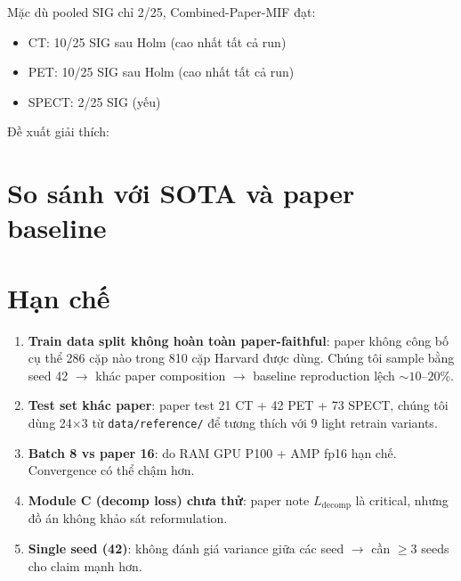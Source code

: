 Mặc dù pooled SIG chỉ 2/25, Combined-Paper-MIF đạt:
\begin{itemize}
    \item CT: 10/25 SIG sau Holm (cao nhất tất cả run)
    \item PET: 10/25 SIG sau Holm (cao nhất tất cả run)
    \item SPECT: 2/25 SIG (yếu)
\end{itemize}

Đề xuất giải thích:

\section{So sánh với SOTA và paper baseline}
\label{sec:disc-sota}


\section{Hạn chế}
\label{sec:limitations}

\begin{enumerate}
    \item \textbf{Train data split không hoàn toàn paper-faithful}: paper không công bố cụ thể 286 cặp nào trong 810 cặp Harvard được dùng. Chúng tôi sample bằng seed 42 $\to$ khác paper composition $\to$ baseline reproduction lệch $\sim 10\text{--}20\%$.
    \item \textbf{Test set khác paper}: paper test 21 CT + 42 PET + 73 SPECT, chúng tôi dùng 24$\times$3 từ \texttt{data/reference/} để tương thích với 9 light retrain variants.
    \item \textbf{Batch 8 vs paper 16}: do RAM GPU P100 + AMP fp16 hạn chế. Convergence có thể chậm hơn.
    \item \textbf{Module C (decomp loss) chưa thử}: paper note $L_{\mathrm{decomp}}$ là critical, nhưng đồ án không khảo sát reformulation.
    \item \textbf{Single seed (42)}: không đánh giá variance giữa các seed $\to$ cần $\geq 3$ seeds cho claim mạnh hơn.
\end{enumerate}
